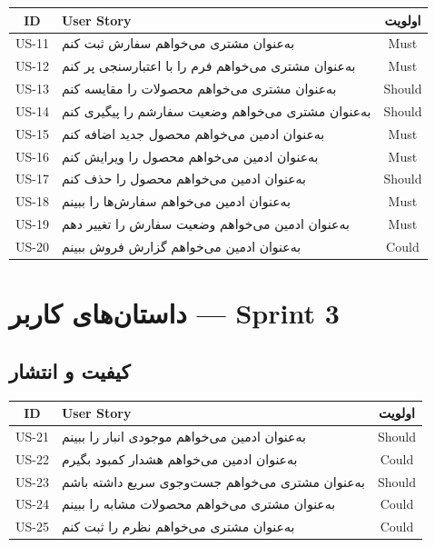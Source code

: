 \documentclass[12pt, a4paper]{article}
\begin{document}
\begin{center}
\begin{tabular}{|c|p{9cm}|c|}
\hline
\textbf{ID} & \textbf{User Story} & \textbf{اولویت} \\
\hline
US-11 & به‌عنوان مشتری می‌خواهم سفارش ثبت کنم & Must \\
\hline
US-12 & به‌عنوان مشتری می‌خواهم فرم را با اعتبارسنجی پر کنم & Must \\
\hline
US-13 & به‌عنوان مشتری می‌خواهم محصولات را مقایسه کنم & Should \\
\hline
US-14 & به‌عنوان مشتری می‌خواهم وضعیت سفارشم را پیگیری کنم & Should \\
\hline
US-15 & به‌عنوان ادمین می‌خواهم محصول جدید اضافه کنم & Must \\
\hline
US-16 & به‌عنوان ادمین می‌خواهم محصول را ویرایش کنم & Must \\
\hline
US-17 & به‌عنوان ادمین می‌خواهم محصول را حذف کنم & Should \\
\hline
US-18 & به‌عنوان ادمین می‌خواهم سفارش‌ها را ببینم & Must \\
\hline
US-19 & به‌عنوان ادمین می‌خواهم وضعیت سفارش را تغییر دهم & Must \\
\hline
US-20 & به‌عنوان ادمین می‌خواهم گزارش فروش ببینم & Could \\
\hline
\end{tabular}
\end{center}

\section{داستان‌های کاربر — Sprint 3}

\subsection{کیفیت و انتشار}

\begin{center}
\begin{tabular}{|c|p{9cm}|c|}
\hline
\textbf{ID} & \textbf{User Story} & \textbf{اولویت} \\
\hline
US-21 & به‌عنوان ادمین می‌خواهم موجودی انبار را ببینم & Should \\
\hline
US-22 & به‌عنوان ادمین می‌خواهم هشدار کمبود بگیرم & Could \\
\hline
US-23 & به‌عنوان مشتری می‌خواهم جست‌وجوی سریع داشته باشم & Should \\
\hline
US-24 & به‌عنوان مشتری می‌خواهم محصولات مشابه را ببینم & Could \\
\hline
US-25 & به‌عنوان مشتری می‌خواهم نظرم را ثبت کنم & Could \\
\hline
\end{tabular}
\end{center}
\end{document}
